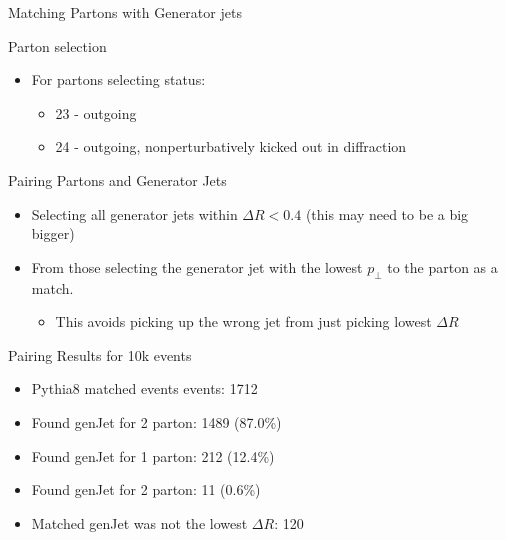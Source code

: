 \documentclass[8pt]{beamer}
\begin{document}
\begin{frame}{Matching Partons with Generator jets}
  
\begin{block}{Parton selection}

\begin{itemize}
  \item For partons selecting status:
  \begin{itemize}
    \item 23 - outgoing
    \item 24 - outgoing, nonperturbatively kicked out in diffraction
  \end{itemize}
\end{itemize}

\end{block}

\begin{block}{Pairing Partons and Generator Jets}

\begin{itemize}
  \item Selecting all generator jets within $\Delta R < 0.4$ (this may need to be a big bigger)
  \item From those selecting the generator jet with the lowest $p_\perp$ to the parton as a match.
  \begin{itemize}
    \item This avoids picking up the wrong jet from just picking lowest $\Delta R$
  \end{itemize}
\end{itemize}

\end{block}

\begin{block}{Pairing Results for 10k events}
  
\begin{itemize}
  \item Pythia8 matched events events: 1712
  \item Found genJet for 2 parton: 1489 (87.0\%)
  \item Found genJet for 1 parton: 212 (12.4\%)
  \item Found genJet for 2 parton: 11 (0.6\%)
  \item Matched genJet was not the lowest $\Delta R$: 120
\end{itemize}

\end{block}

\end{frame}
\end{document}

